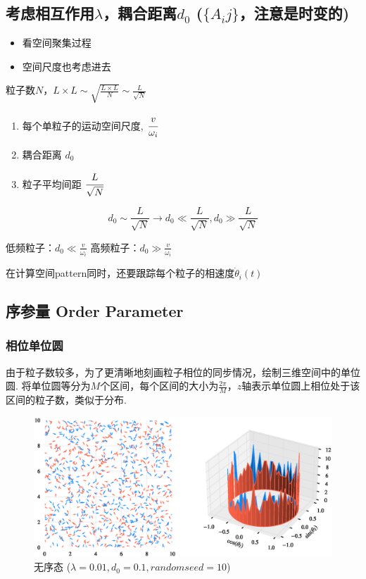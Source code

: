 \documentclass{article}
\begin{document}
\subsection{考虑相互作用$\lambda$，耦合距离$d_0$ ($\{A_ij\}$，注意是时变的)}

\begin{itemize}
    \item 看空间聚集过程
    \item 空间尺度也考虑进去
\end{itemize}

粒子数$N$，$L\times L\sim \sqrt{\frac{L\times L}{N}}\sim \frac{L}{\sqrt{N}}$

\begin{enumerate}
    \item 每个单粒子的运动空间尺度, $\cfrac{v}{\omega_i}$
    \item 耦合距离 $d_0$
    \item 粒子平均间距 $\cfrac{L}{\sqrt{N}}$
\end{enumerate}

$$
d_0\sim \frac{L}{\sqrt{N}}\rightarrow d_0\ll \frac{L}{\sqrt{N}}, d_0\gg \frac{L}{\sqrt{N}}
$$

低频粒子：$d_0\ll \frac{v}{\omega _i}$
高频粒子：$d_0\gg \frac{v}{\omega _i}$

在计算空间pattern同时，还要跟踪每个粒子的相速度$\dot{\theta}_i(t)$

\newpage
\subsection{序参量 Order Parameter}

\subsubsection{相位单位圆}

由于粒子数较多，为了更清晰地刻画粒子相位的同步情况，绘制三维空间中的单位圆. 将单位圆等分为$M$个区间，每个区间的大小为$\frac{2\pi}{M}$，$z$轴表示单位圆上相位处于该区间的粒子数，类似于分布.

\begin{figure}[H]
	\centering
	\includegraphics[width=\textwidth]{./figs/CorrectCoupling_uniform_0.010_0.10.eps}
	\vspace{-1cm}
	\caption{无序态 ($\lambda=0.01, d_0=0.1, random seed=10$)}
	\label{fig:fig231.1}
\end{figure}
\end{document}
